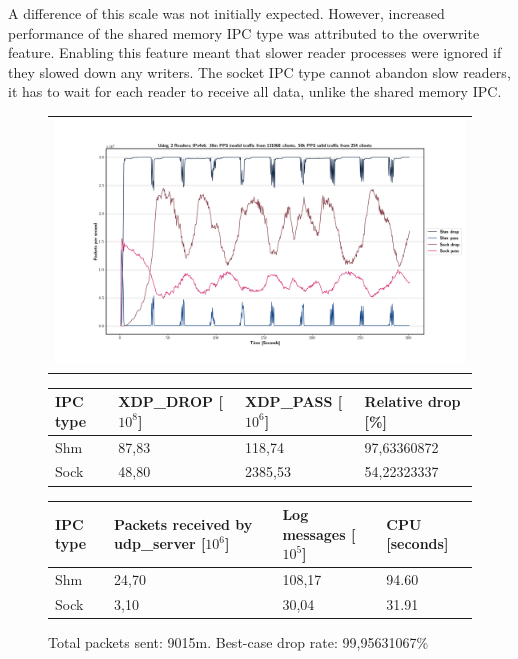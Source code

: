 A difference of this scale was not initially expected.
However, increased performance of the shared memory \ac{IPC} type was attributed to the overwrite feature.
Enabling this feature meant that slower reader processes were ignored if they slowed down any writers.
The socket \ac{IPC} type cannot abandon slow readers, it has to wait for each reader to receive all data, unlike the shared memory \ac{IPC}.

\begin{figure}[!h]
	\centering
	\scriptsize
	\begin{tabular}{c}
    	\centerline{\includegraphics[width=1.2\textwidth]{images/IPv4v6_30m_2ndReader_1.png}}
	\end{tabular}
	\begin{tabular}{llll}
		\toprule
		\textbf{IPC type} & \textbf{XDP\_DROP [$10^8$]} & \textbf{XDP\_PASS [$10^6$]} & \textbf{Relative drop [\%]} \\ \midrule 
		Shm & 87,83 & 118,74 & 97,63360872 \\
        Sock & 48,80 & 2385,53 & 54,22323337 \\
	\bottomrule
	\end{tabular}
    \begin{tabular}{llll}
		\toprule
		\textbf{IPC type} & \textbf{Packets received by udp\_server [$10^6$]} & \textbf{Log messages [$10^5$]} & \textbf{CPU [seconds]} \\ \midrule 
		Shm & 24,70 & 108,17 & 94.60 \\
        Sock & 3,10 & 30,04 & 31.91 \\
	\bottomrule
	\end{tabular}
	\caption[Simplefail2ban with 2nd Reader, IPv4v6, 30m \ac{PPS}, 131068 malicious clients]{Total packets sent: 9015m. Best-case drop rate: 99,95631067\%}
	\label{fig:data:ipv4v6:30m:131068:2nd}
\end{figure}

